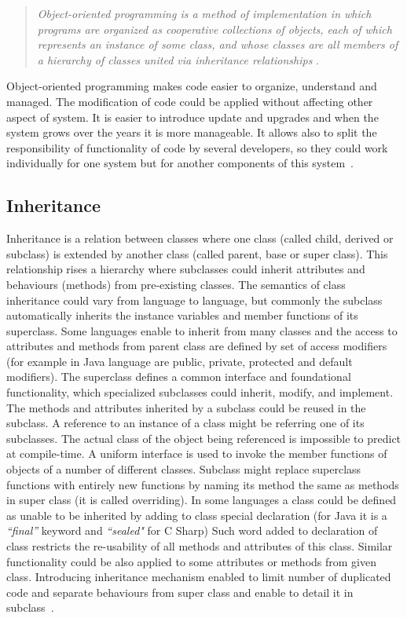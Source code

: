 \begin{quote}
\textit{Object-oriented programming is a method of implementation in which programs are organized as cooperative collections of objects, each of which represents an instance of some class, and whose classes are all members of a hierarchy of classes united via inheritance relationships} \cite{booch}.
\end{quote}

Object-oriented programming makes code easier to organize, understand and managed. The modification of code could be applied without affecting other aspect of system. It is easier to introduce update and upgrades and when the system grows over the years it is more manageable. It allows also to split the responsibility of functionality of code by several developers, so they could work individually for one system but for another components of this system~\cite{booch}.  

\subsection*{Inheritance}
Inheritance is a relation between classes where one class (called child, derived or subclass)  is extended by another class (called parent, base  or super class). This relationship rises a hierarchy where subclasses could inherit attributes and behaviours (methods) from pre-existing classes. The semantics of class inheritance could vary from language to language, but commonly the subclass automatically inherits the instance variables and member functions of its superclass. Some languages enable to inherit from many classes and the access to attributes and methods from parent class are defined by set of access modifiers (for example in Java language are public, private, protected and default modifiers).  The superclass defines a common interface and foundational functionality, which specialized subclasses could inherit, modify, and implement. The methods and attributes inherited by a subclass could be reused in the subclass. A reference to an instance of a class might be referring one of its subclasses. The actual class of the object being referenced is impossible to predict at compile-time. A uniform interface is used to invoke the member functions of objects of a number of different classes. Subclass might replace superclass functions with entirely new functions by naming its method the same as methods in super class (it is called overriding).  In some languages a class could be defined as unable to be inherited by adding to class special declaration (for Java it is a \textit{``final''} keyword and \textit{``sealed"} for C Sharp) Such word added to declaration of class restricts the re-usability of all methods and attributes of this class. Similar functionality could be also applied to some attributes or methods  from given class. 
Introducing inheritance mechanism enabled to limit number of duplicated code and separate behaviours from super class and enable to detail it in subclass~\cite{SCJP}.

